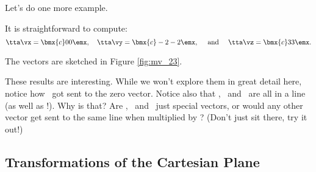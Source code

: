 \medskip

Let's do one more example.

\medskip


{\begin{myfigure}%
\begin{center}
\end{center}
\label{fig:mv_23}
\end{myfigure}%

It is straightforward to compute: 
\[
\tta\vx = \bmx{c} 0\\0\emx,\quad \tta\vy = \bmx{c} -2\\-2\emx, \quad \text{ and } \quad \tta\vz = \bmx{c} 3\\3\emx.
\]

The vectors are sketched in Figure \ref{fig:mv_23}.

These results are interesting. While we won't explore them in great detail here, notice how \vx\ got sent to the zero vector. Notice also that \tta\vx, \tta\vy\ and \tta\vz\ are all in a line (as well as \vx!). Why is that? Are \vx, \vy\ and \vz\ just special vectors, or would any other vector get sent to the same line when multiplied by \tta? (Don't just sit there, try it out!)
}

\medskip

\subsection*{Transformations of the Cartesian Plane}

